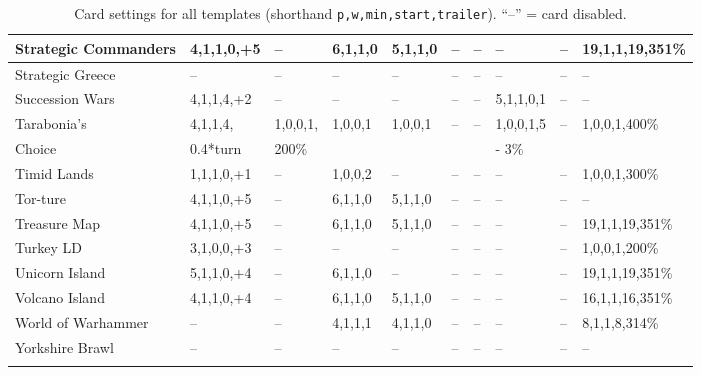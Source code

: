 \begin{longtable}{|p{1.8cm}|p{1cm}|p{0.8cm}|p{1cm}|p{1cm}|p{1cm}|p{1cm}|p{1.3cm}|p{1cm}|p{1.4cm}|}
Strategic Commanders      & 4,1,1,0,+5  & –                    & 6,1,1,0   & 5,1,1,0   & –   & –   & –               & –   & 19,1,1,19,351\% \\ \hline
Strategic Greece          & –           & –                    & –         & –         & –   & –   & –               & –   & – \\ \hline
Succession Wars           & 4,1,1,4,+2  & –                    & –         & –         & –   & –   & 5,1,1,0,1       & –   & – \\ \hline
Tarabonia's        & 4,1,1,4, & 1,0,0,1,   & 1,0,0,1   & 1,0,0,1   & –   & –   & 1,0,0,1,5 & –   & 1,0,0,1,400\% \\ 
Choice & 0.4*turn & 200\% & & & & & - 3\% & & \\ \hline
Timid Lands               & 1,1,1,0,+1  & –                    & 1,0,0,2   & –         & –   & –   & –               & –   & 1,0,0,1,300\% \\ \hline
Tor-ture                  & 4,1,1,0,+5  & –                    & 6,1,1,0   & 5,1,1,0   & –   & –   & –               & –   & – \\ \hline
Treasure Map              & 4,1,1,0,+5  & –                    & 6,1,1,0   & 5,1,1,0   & –   & –   & –               & –   & 19,1,1,19,351\% \\ \hline
Turkey LD                 & 3,1,0,0,+3  & –                    & –         & –         & –   & –   & –               & –   & 1,0,0,1,200\% \\ \hline
Unicorn Island            & 5,1,1,0,+4  & –                    & 6,1,1,0   & –         & –   & –   & –               & –   & 19,1,1,19,351\% \\ \hline
Volcano Island            & 4,1,1,0,+4  & –                    & 6,1,1,0   & 5,1,1,0   & –   & –   & –               & –   & 16,1,1,16,351\% \\ \hline
World of Warhammer        & –           & –                    & 4,1,1,1   & 4,1,1,0   & –   & –   & –               & –   & 8,1,1,8,314\% \\ \hline
Yorkshire Brawl           & –           & –                    & –         & –         & –   & –   & –               & –   & – \\ \hline
\caption{Card settings for all templates (shorthand \texttt{p,w,min,start,trailer}).  “–” = card disabled.}
\label{table:card_strings_slim}
\end{longtable}
\normalsize

